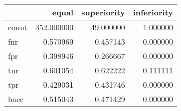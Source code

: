 \begin{tabular}{lrrr}
\toprule
{} &       equal &  superiority &  inferiority \\
\midrule
count &  352.000000 &    49.000000 &     1.000000 \\
fnr   &    0.570969 &     0.457143 &     0.000000 \\
fpr   &    0.398946 &     0.266667 &     0.000000 \\
tnr   &    0.601054 &     0.622222 &     0.111111 \\
tpr   &    0.429031 &     0.431746 &     0.000000 \\
bacc  &    0.515043 &     0.471429 &     0.000000 \\
\bottomrule
\end{tabular}
